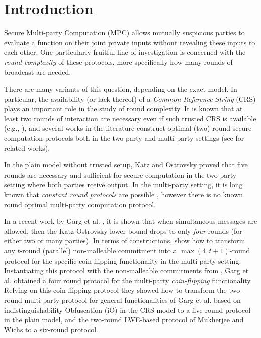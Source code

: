 \section{Introduction}
Secure Multi-party Computation (MPC) \cite{FOCS:Yao82b,FOCS:Yao86,GMW87} allows mutually suspicious parties to evaluate a function on their joint private inputs without revealing these inputs to each other.
One particularly fruitful line of investigation is concerned with the \emph{round complexity} of these protocols, more specifically how many rounds of broadcast are needed.

There are many variants of this question, depending on the exact model. In particular, the availability (or lack thereof) of a \emph{Common Reference String} (CRS) plays an important role in the study of round complexity. It is known that at least two rounds of interaction are necessary even if such trusted CRS is available (e.g., \cite{C:HalLinPin11}), and several works in the literature construct optimal (two) round secure computation protocols both in the two-party and multi-party settings (see  for related works).

In the plain model without trusted setup, Katz and Ostrovsky \cite{C:KatOst04} proved that five rounds are necessary and sufficient for secure computation in the two-party setting where both parties rceive output. In the multi-party setting, it is long known that \emph{constant round protocols} are possible \cite{STOC:BeaMicRog90,EC:KatOstSmi03,STOC:Pass04,C:DamIsh05,C:DamIsh06,C:IshPraSah08,C:PanPasVai08,FOCS:Wee10,STOC:Goyal11,STOC:LinPas11,FOCS:GLOV12}, however there is no known round optimal multi-party computation protocol. 

In a recent work by Garg et al. \cite{EC:GMPP16}, it is shown that when simultaneous messages are allowed, then the Katz-Ostrovsky lower bound drops to only \emph{four} rounds (for either two or many parties). In terms of constructions, \cite{EC:GMPP16} show how to transform any $t$-round (parallel) non-malleable commitment into a $\max(4,t+1)$-round protocol for the specific coin-flipping functionality in the multi-party setting. Instantiating this protocol with the non-malleable commitments from \cite{C:PanPasVai08,C:COSV16}, Garg et al. obtained a four round protocol for the multi-party {\em coin-flipping} functionality. Relying on this coin-flipping protocol they showed how to transform the two-round multi-party protocol for general functionalities of Garg et al. \cite{TCC:GGHR14} based on indistinguishability Obfuscation (iO) \cite{FOCS:GGHRSW13} in the CRS model to a five-round protocol in the plain model, and the two-round LWE-based protocol of Mukherjee and Wichs \cite{MW16} to a six-round protocol.

